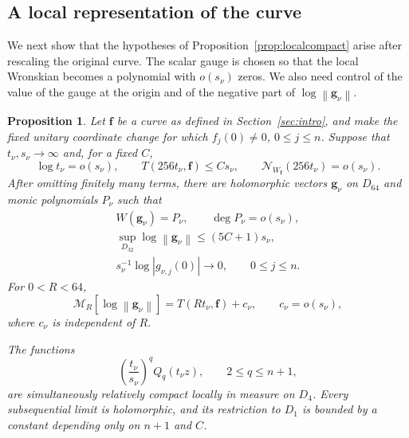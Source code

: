 \documentclass[12pt,letterpaper,reqno]{amsart}
\newtheorem{prop}[thm]{Proposition}
\theoremstyle{definition}
\numberwithin{equation}{section}
\newcommand{\NN}{\mathcal N}
\newcommand{\mean}[2]{\mathcal M_{#1}\!\left[#2\right]}
\newcommand{\norm}[1]{\left\lVert#1\right\rVert}
\newcommand{\fv}{\bm f}
\newcommand{\gv}{\bm g}
\begin{document}
\subsection{A local representation of the curve}
\label{sec:representation}

We next show that the hypotheses of
Proposition~\ref{prop:localcompact} arise after rescaling the original
curve. The scalar gauge is chosen so that the local Wronskian becomes a
polynomial with \(o(s_\nu)\) zeros. We also need control of the value
of the gauge at the origin and of the negative part of
\(\log\norm{\gv_\nu}\).

\begin{prop}\label{prop:representation}
Let \(\fv\) be a curve as defined in Section~\ref{sec:intro}, and make
the fixed unitary coordinate change for which
\(f_j(0)\ne0\), \(0\leq j\leq n\).
Suppose that \(t_\nu,s_\nu\to\infty\) and, for a fixed \(C\),
\begin{equation}\label{eq:scalehyp}
 \log t_\nu=o(s_\nu),
 \qquad
 T(256t_\nu,\fv)\leq Cs_\nu,
 \qquad
 \NN_{W_{\fv}}(256t_\nu)=o(s_\nu).
\end{equation}
After omitting finitely many terms, there are holomorphic vectors
\(\gv_\nu\) on \(D_{64}\) and monic polynomials \(P_\nu\) such that
\begin{equation}\label{eq:representationbounds}
 \begin{gathered}
 W(\gv_\nu)=P_\nu,
 \qquad
 \deg P_\nu=o(s_\nu),\\
 \sup_{D_{32}}\log\norm{\gv_\nu}
 \leq(5C+1)s_\nu,\\
 s_\nu^{-1}\log|g_{\nu,j}(0)|
 \longrightarrow0,
 \qquad
 0\leq j\leq n.
 \end{gathered}
\end{equation}
For \(0<R<64\),
\begin{equation}\label{eq:meanidentity}
 \mean R{\log\norm{\gv_\nu}}
 =
 T(Rt_\nu,\fv)+c_\nu,
 \qquad
 c_\nu=o(s_\nu),
\end{equation}
where \(c_\nu\) is independent of \(R\).

The functions
\begin{equation}\label{eq:scaledcompact}
 \left(\frac{t_\nu}{s_\nu}\right)^qQ_q(t_\nu z),
 \qquad
 2\leq q\leq n+1,
\end{equation}
are simultaneously relatively compact locally in measure on \(D_4\).
Every subsequential limit is holomorphic, and its restriction to
\(D_1\) is bounded by a constant depending only on \({n+1}\) and \(C\).
\end{prop}
\end{document}
